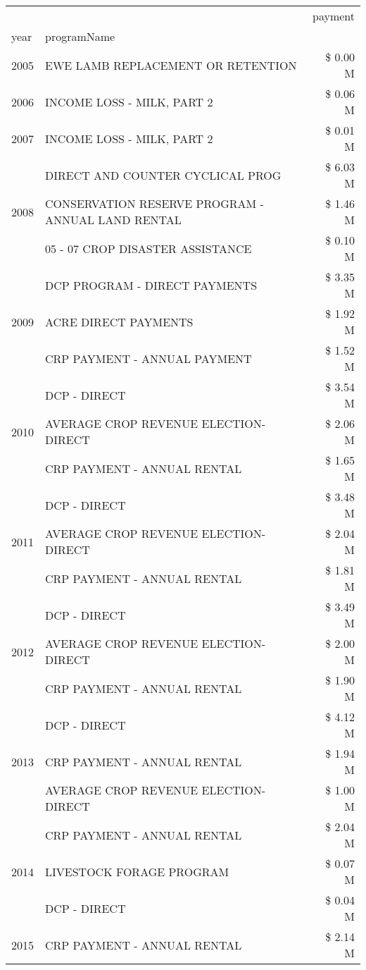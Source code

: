 \begin{tabular}{llr}
\toprule
 &  & payment \\
year & programName &  \\
\midrule
2005 & EWE LAMB REPLACEMENT OR RETENTION & \$ 0.00 M \\
\cline{1-3}
2006 & INCOME LOSS - MILK, PART 2 & \$ 0.06 M \\
\cline{1-3}
2007 & INCOME LOSS - MILK, PART 2 & \$ 0.01 M \\
\cline{1-3}
\multirow[t]{3}{*}{2008} & DIRECT AND COUNTER CYCLICAL PROG & \$ 6.03 M \\
 & CONSERVATION RESERVE PROGRAM - ANNUAL LAND RENTAL & \$ 1.46 M \\
 & 05 - 07 CROP DISASTER ASSISTANCE & \$ 0.10 M \\
\cline{1-3}
\multirow[t]{3}{*}{2009} & DCP PROGRAM - DIRECT PAYMENTS & \$ 3.35 M \\
 & ACRE DIRECT PAYMENTS & \$ 1.92 M \\
 & CRP PAYMENT - ANNUAL PAYMENT & \$ 1.52 M \\
\cline{1-3}
\multirow[t]{3}{*}{2010} & DCP - DIRECT & \$ 3.54 M \\
 & AVERAGE CROP REVENUE ELECTION-DIRECT & \$ 2.06 M \\
 & CRP PAYMENT - ANNUAL RENTAL & \$ 1.65 M \\
\cline{1-3}
\multirow[t]{3}{*}{2011} & DCP - DIRECT & \$ 3.48 M \\
 & AVERAGE CROP REVENUE ELECTION-DIRECT & \$ 2.04 M \\
 & CRP PAYMENT - ANNUAL RENTAL & \$ 1.81 M \\
\cline{1-3}
\multirow[t]{3}{*}{2012} & DCP - DIRECT & \$ 3.49 M \\
 & AVERAGE CROP REVENUE ELECTION-DIRECT & \$ 2.00 M \\
 & CRP PAYMENT - ANNUAL RENTAL & \$ 1.90 M \\
\cline{1-3}
\multirow[t]{3}{*}{2013} & DCP - DIRECT & \$ 4.12 M \\
 & CRP PAYMENT - ANNUAL RENTAL & \$ 1.94 M \\
 & AVERAGE CROP REVENUE ELECTION-DIRECT & \$ 1.00 M \\
\cline{1-3}
\multirow[t]{3}{*}{2014} & CRP PAYMENT - ANNUAL RENTAL & \$ 2.04 M \\
 & LIVESTOCK FORAGE PROGRAM & \$ 0.07 M \\
 & DCP - DIRECT & \$ 0.04 M \\
\cline{1-3}
\multirow[t]{3}{*}{2015} & CRP PAYMENT - ANNUAL RENTAL & \$ 2.14 M \\

\end{tabular}
